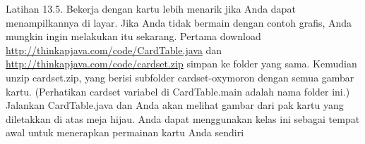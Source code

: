 \documentclass[12pt,b5paper,openright,twoside]{book}
\begin{document}
\noindent Latihan 13.5. Bekerja dengan kartu lebih menarik jika Anda dapat menampilkannya di layar. Jika Anda tidak bermain dengan contoh grafis, Anda mungkin ingin melakukan itu sekarang.
Pertama download \url{http://thinkapjava.com/code/CardTable.java} dan \url{http://thinkapjava.com/code/cardset.zip} simpan ke folder yang sama. Kemudian unzip cardset.zip, yang berisi subfolder cardset-oxymoron dengan semua gambar kartu. (Perhatikan cardset variabel di CardTable.main adalah nama folder ini.) Jalankan CardTable.java dan Anda akan melihat gambar dari pak kartu yang diletakkan di atas meja hijau.
Anda dapat menggunakan kelas ini sebagai tempat awal untuk menerapkan permainan kartu Anda sendiri
\end{document}
